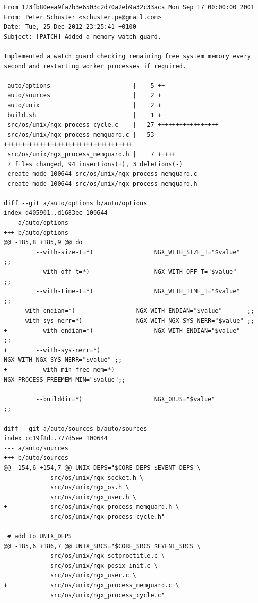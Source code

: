 \begin{verbatim}
From 123fb80eea9fa7b3e6503c2d70a2eb9a32c33aca Mon Sep 17 00:00:00 2001
From: Peter Schuster <schuster.pe@gmail.com>
Date: Tue, 25 Dec 2012 23:25:41 +0100
Subject: [PATCH] Added a memory watch guard.

Implemented a watch guard checking remaining free system memory every
second and restarting worker processes if required.
---
 auto/options                       |    5 ++-
 auto/sources                       |    2 +
 auto/unix                          |    2 +
 build.sh                           |    1 +
 src/os/unix/ngx_process_cycle.c    |   27 +++++++++++++++++-
 src/os/unix/ngx_process_memguard.c |   53 ++++++++++++++++++++++++++++++++++++
 src/os/unix/ngx_process_memguard.h |    7 +++++
 7 files changed, 94 insertions(+), 3 deletions(-)
 create mode 100644 src/os/unix/ngx_process_memguard.c
 create mode 100644 src/os/unix/ngx_process_memguard.h

diff --git a/auto/options b/auto/options
index d405901..d1683ec 100644
--- a/auto/options
+++ b/auto/options
@@ -185,8 +185,9 @@ do
         --with-size-t=*)                 NGX_WITH_SIZE_T="$value"       ;;
         --with-off-t=*)                  NGX_WITH_OFF_T="$value"        ;;
         --with-time-t=*)                 NGX_WITH_TIME_T="$value"       ;;
-	--with-endian=*)                 NGX_WITH_ENDIAN="$value"   	;;
-	--with-sys-nerr=*)               NGX_WITH_NGX_SYS_NERR="$value" ;;
+        --with-endian=*)                 NGX_WITH_ENDIAN="$value"       ;;
+        --with-sys-nerr=*)               NGX_WITH_NGX_SYS_NERR="$value" ;;
+        --with-min-free-mem=*)           NGX_PROCESS_FREEMEM_MIN="$value";;
 
         --builddir=*)                    NGX_OBJS="$value"          ;;
 
diff --git a/auto/sources b/auto/sources
index cc19f8d..777d5ee 100644
--- a/auto/sources
+++ b/auto/sources
@@ -154,6 +154,7 @@ UNIX_DEPS="$CORE_DEPS $EVENT_DEPS \
             src/os/unix/ngx_socket.h \
             src/os/unix/ngx_os.h \
             src/os/unix/ngx_user.h \
+            src/os/unix/ngx_process_memguard.h \
             src/os/unix/ngx_process_cycle.h"
 
 # add to UNIX_DEPS
@@ -185,6 +186,7 @@ UNIX_SRCS="$CORE_SRCS $EVENT_SRCS \
             src/os/unix/ngx_setproctitle.c \
             src/os/unix/ngx_posix_init.c \
             src/os/unix/ngx_user.c \
+            src/os/unix/ngx_process_memguard.c \
             src/os/unix/ngx_process_cycle.c"
 

\end{verbatim}
